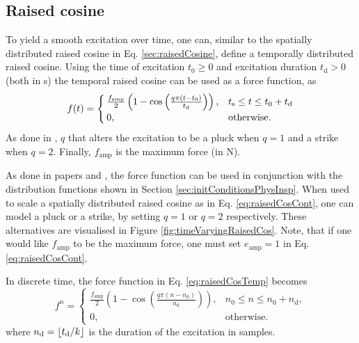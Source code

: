 \subsection{Raised cosine}
To yield a smooth excitation over time, one can, similar to the spatially distributed raised cosine in Eq. \ref{sec:raisedCosine}, define a temporally distributed raised cosine. Using the time of excitation $t_0\geq 0$ and excitation duration $t_\text{d}>0$ (both in s) the temporal raised cosine can be used as a force function, as
\begin{equation}\label{eq:raisedCosTemp}
    f(t) = 
    \begin{cases}
        \frac{f_\text{amp}}{2} \left(1 - \cos\left(\frac{q\pi (t - t_0)}{t_\text{d}}\right)\right), & t_{\text{s}} \leq t \leq t_0 + t_\text{d}\\
        0, &\text{otherwise}.
    \end{cases}
\end{equation} 
As done in \cite{Webb2015}, $q$ that alters the excitation to be a pluck when $q=1$ and a strike when $q=2$. Finally, $f_\text{amp}$ is the maximum force (in N). 

As done in papers \citeP[A] and \citeP[B], the force function can be used in conjunction with the distribution functions shown in Section \ref{sec:initConditionsPhysInsp}. When used to scale a spatially distributed raised cosine as in Eq. \eqref{eq:raisedCosCont}, one can model a pluck or a strike, by setting $q=1$ or $q=2$ respectively. These alternatives are visualised in Figure \ref{fig:timeVaryingRaisedCos}. Note, that if one would like $f_\text{amp}$ to be the maximum force, one must set $e_\text{amp} = 1$ in Eq. \eqref{eq:raisedCosCont}. 

In discrete time, the force function in Eq. \eqref{eq:raisedCosTemp} becomes
\begin{equation}\label{eq:discExcitation}
    f^n = 
    \begin{cases}
        \frac{f_\text{amp}}{2}\left(1-\cos\left(\frac{q\pi (n - n_0)}{n_\text{d}}\right)\right), & n_0 \leq n \leq n_0+n_\text{d},\\
        0, &\text{otherwise}.
    \end{cases}
\end{equation}
where $n_\text{d} = \floor[t_\text{d}/k]$ is the duration of the excitation in samples.


